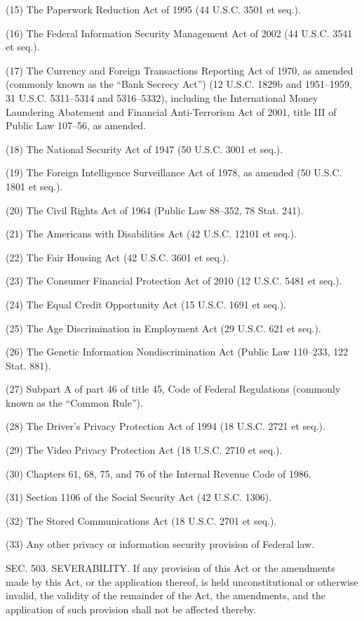 (15) The Paperwork Reduction Act of 1995 (44 U.S.C. 3501 et seq.).

(16) The Federal Information Security Management Act of 2002 (44 U.S.C. 3541 et seq.).

(17) The Currency and Foreign Transactions Reporting Act of 1970, as amended (commonly known as the “Bank Secrecy Act”) (12 U.S.C. 1829b and 1951–1959, 31 U.S.C. 5311–5314 and 5316–5332), including the International Money Laundering Abatement and Financial Anti-Terrorism Act of 2001, title III of Public Law 107–56, as amended.

(18) The National Security Act of 1947 (50 U.S.C. 3001 et seq.).

(19) The Foreign Intelligence Surveillance Act of 1978, as amended (50 U.S.C. 1801 et seq.).

(20) The Civil Rights Act of 1964 (Public Law 88–352, 78 Stat. 241).

(21) The Americans with Disabilities Act (42 U.S.C. 12101 et seq.).

(22) The Fair Housing Act (42 U.S.C. 3601 et seq.).

(23) The Consumer Financial Protection Act of 2010 (12 U.S.C. 5481 et seq.).

(24) The Equal Credit Opportunity Act (15 U.S.C. 1691 et seq.).

(25) The Age Discrimination in Employment Act (29 U.S.C. 621 et seq.).

(26) The Genetic Information Nondiscrimination Act (Public Law 110–233, 122 Stat. 881).

(27) Subpart A of part 46 of title 45, Code of Federal Regulations (commonly known as the “Common Rule”).

(28) The Driver’s Privacy Protection Act of 1994 (18 U.S.C. 2721 et seq.).

(29) The Video Privacy Protection Act (18 U.S.C. 2710 et seq.).

(30) Chapters 61, 68, 75, and 76 of the Internal Revenue Code of 1986.

(31) Section 1106 of the Social Security Act (42 U.S.C. 1306).

(32) The Stored Communications Act (18 U.S.C. 2701 et seq.).

(33) Any other privacy or information security provision of Federal law.


SEC. 503. SEVERABILITY.
If any provision of this Act or the amendments made by this Act, or the application thereof, is held unconstitutional or otherwise invalid, the validity of the remainder of the Act, the amendments, and the application of such provision shall not be affected thereby.


